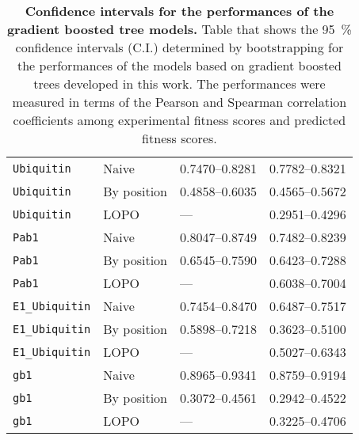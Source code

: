 \begin{table}[p]
{\begin{tabular*}{\linewidth}{@{\extracolsep{\fill}}llll}
			\texttt{Ubiquitin}      & Naive       & \numrange{0.7470}{0.8281}        & \numrange{0.7782}{0.8321}         \\
			\texttt{Ubiquitin}      & By position & \numrange{0.4858}{0.6035}        & \numrange{0.4565}{0.5672}         \\
			\texttt{Ubiquitin}      & LOPO        & ---                              & \numrange{0.2951}{0.4296}         \\
			\texttt{Pab1}           & Naive       & \numrange{0.8047}{0.8749}        & \numrange{0.7482}{0.8239}         \\
			\texttt{Pab1}           & By position & \numrange{0.6545}{0.7590}        & \numrange{0.6423}{0.7288}         \\
			\texttt{Pab1}           & LOPO        & ---                              & \numrange{0.6038}{0.7004}         \\
			\texttt{E1\_Ubiquitin}  & Naive       & \numrange{0.7454}{0.8470}        & \numrange{0.6487}{0.7517}         \\
			\texttt{E1\_Ubiquitin}  & By position & \numrange{0.5898}{0.7218}        & \numrange{0.3623}{0.5100}         \\
			\texttt{E1\_Ubiquitin}  & LOPO        & ---                              & \numrange{0.5027}{0.6343}         \\
			\texttt{gb1}            & Naive       & \numrange{0.8965}{0.9341}        & \numrange{0.8759}{0.9194}         \\
			\texttt{gb1}            & By position & \numrange{0.3072}{0.4561}        & \numrange{0.2942}{0.4522}         \\
			\texttt{gb1}            & LOPO        & ---                              & \numrange{0.3225}{0.4706}         \\
			\bottomrule
		\end{tabular*}%
	}%
	{\caption[Confidence intervals for the performances of the gradient boosted tree models]{%
			\textbf{Confidence intervals for the performances of the gradient boosted tree models.}
			Table that shows the \SI{95}{\percent} confidence intervals (C.I.) determined by bootstrapping for the performances of the models based on gradient boosted trees developed in this work.
			The performances were measured in terms of the Pearson and Spearman correlation coefficients among experimental fitness scores and predicted fitness scores.
		}\label{tab:confidence_intervals}%
	}%
\end{table}

